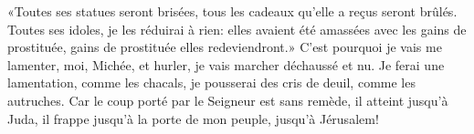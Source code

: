 «Toutes ses statues seront brisées,
	tous les cadeaux qu’elle a reçus seront brûlés.
Toutes ses idoles, je les réduirai à rien:
	elles avaient été amassées avec les gains de prostituée,
	gains de prostituée elles redeviendront.»
C’est pourquoi je vais me lamenter, moi, Michée, et hurler,
	je vais marcher déchaussé et nu.
Je ferai une lamentation, comme les chacals,
	je pousserai des cris de deuil, comme les autruches.
Car le coup porté par le Seigneur est sans remède, il atteint jusqu’à Juda,
	il frappe jusqu’à la porte de mon peuple, jusqu’à Jérusalem!

